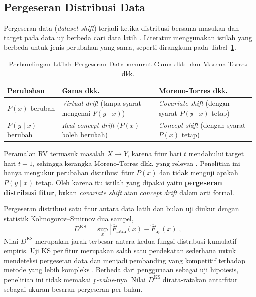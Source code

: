 \subsection{Pergeseran Distribusi Data}
Pergeseran data (\textit{dataset shift}) terjadi ketika distribusi bersama
masukan dan target pada data uji berbeda dari data latih
\cite{morenotorres2012}. Literatur menggunakan istilah yang berbeda untuk jenis
perubahan yang sama, seperti dirangkum pada Tabel~\ref{tab:istilah}.

\begin{table}[htbp]
  \caption{Perbandingan Istilah Pergeseran Data menurut Gama dkk. dan
    Moreno-Torres dkk.}
  \label{tab:istilah}
  \centering
  \begingroup
  \small
  \begin{tabular}{|l|p{}|p{}|}
    \hline
    \textbf{Perubahan} & \textbf{Gama dkk. \cite{gama2014}} &
    \textbf{Moreno-Torres dkk. \cite{morenotorres2012}} \\
    \hline
    $P(x)$ berubah & \textit{Virtual drift} (tanpa syarat mengenai
    $P(y \mid x)$) & \textit{Covariate shift} (dengan syarat $P(y \mid x)$
    tetap) \\
    \hline
    $P(y \mid x)$ berubah & \textit{Real concept drift} ($P(x)$ boleh berubah) &
    \textit{Concept shift} (dengan syarat $P(x)$ tetap) \\
    \hline
  \end{tabular}
  \endgroup
\end{table}

Peramalan RV termasuk masalah $X \rightarrow Y$, karena fitur hari $t$
mendahului target hari $t+1$, sehingga kerangka Moreno-Torres dkk. yang relevan
\cite{morenotorres2012}. Penelitian ini hanya mengukur perubahan distribusi
fitur $P(x)$ dan tidak menguji apakah $P(y \mid x)$ tetap. Oleh karena itu
istilah yang dipakai yaitu \textbf{pergeseran distribusi fitur}, bukan
\textit{covariate shift} atau \textit{concept drift} dalam arti formal.

Pergeseran distribusi satu fitur antara data latih dan bulan uji diukur dengan
statistik Kolmogorov--Smirnov dua sampel,
\begin{equation}
  D^{\text{KS}} = \sup_x
  \left| \hat{F}_{\text{latih}}(x) - \hat{F}_{\text{uji}}(x) \right|,
  \label{eq:ks}
\end{equation}
Nilai $D^{\text{KS}}$ merupakan jarak terbesar antara kedua fungsi distribusi
kumulatif empiris. Uji KS per fitur merupakan salah satu pendekatan sederhana
untuk mendeteksi pergeseran data dan menjadi pembanding yang kompetitif
terhadap metode yang lebih kompleks \cite{rabanser2019}. Berbeda dari
penggunaan sebagai uji hipotesis, penelitian ini tidak memakai
\textit{p-value}-nya. Nilai $D^{\text{KS}}$ dirata-ratakan antarfitur sebagai
ukuran besaran pergeseran per bulan.

